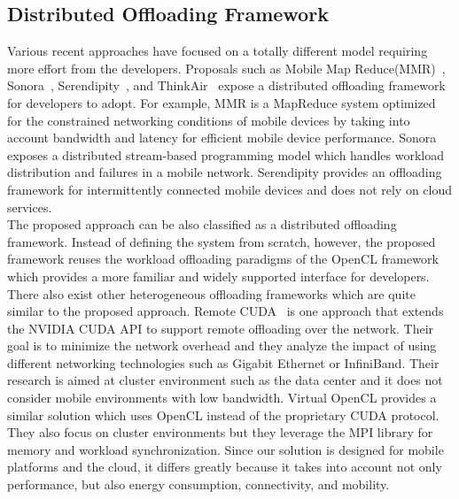 \subsection{Distributed Offloading Framework}
\label{intro:framework}
%
Various recent approaches have focused on a totally different model
requiring more effort from the developers.
%
Proposals such as Mobile Map Reduce(MMR)~\cite{mmr},
Sonora~\cite{sonora}, Serendipity~\cite{serendipity}, and
ThinkAir~\cite{thinkair} expose a distributed offloading framework for
developers to adopt.
%
For example, MMR is a MapReduce system optimized for the constrained
networking conditions of mobile devices by taking into account
bandwidth and latency for efficient mobile device performance.
%
Sonora exposes a distributed stream-based programming model which
handles workload distribution and failures in a mobile network.
%
Serendipity provides an offloading framework for intermittently
connected mobile devices and does not rely on cloud services.\\
%
The proposed approach can be also classified as a distributed offloading
framework.
%
Instead of defining the system from scratch, however, the proposed
framework reuses the workload offloading paradigms of the OpenCL
framework which provides a more familiar and widely supported interface
for developers.
%
There also exist other heterogeneous offloading frameworks which are
quite similar to the proposed approach.
%
Remote CUDA~\cite{rcuda} is one approach that extends the NVIDIA CUDA
API to support remote offloading over the network.
%
Their goal is to minimize the network overhead and they analyze the
impact of using different networking technologies such as Gigabit
Ethernet or InfiniBand.
%
Their research is aimed at cluster environment such as the data center
and it does not consider mobile environments with low bandwidth.
%
Virtual OpenCL\cite{vocl} provides a similar solution which uses
OpenCL instead of the proprietary CUDA protocol.
%
They also focus on cluster environments but they leverage the MPI
library for memory and workload synchronization.
%
Since our solution is designed for mobile platforms and the cloud, it
differs greatly because it takes into account not only performance, but
also energy consumption, connectivity, and mobility.
%
